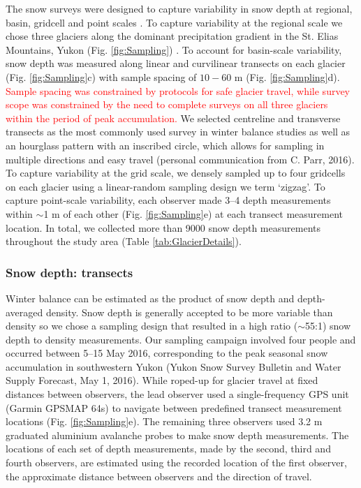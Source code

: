 \documentclass[twocolumn, letterpaper]{igs}
\begin{document}
The snow surveys were designed to capture variability in snow depth at regional, basin, gridcell and point scales \citep{Clark2011}. To capture variability at the regional scale we chose three glaciers along the dominant precipitation gradient in the St. Elias Mountains, Yukon (Fig. \ref{fig:Sampling}) \citep{Taylor1969}. To account for basin-scale variability, snow depth was measured along linear and curvilinear transects on each glacier (Fig. \ref{fig:Sampling}c) with sample spacing of $10-60$ m (Fig. \ref{fig:Sampling}d). \textcolor{red}{Sample spacing was constrained by protocols for safe glacier travel, while survey scope was constrained by the need to complete surveys on all three glaciers within the period of peak accumulation.} We selected centreline and transverse transects as the most commonly used survey in winter balance studies \citep[e.g.][]{Kaser2003, Machguth2006} as well as an hourglass pattern with an inscribed circle, which allows for sampling in multiple directions and easy travel (personal communication from C. Parr, 2016). To capture variability at the grid scale, we densely sampled up to four gridcells on each glacier using a linear-random sampling design we term `zigzag'. To capture point-scale variability, each observer made 3--4 depth measurements within $\sim$1 m of each other (Fig. \ref{fig:Sampling}e) at each transect measurement location. In total, we collected more than 9000 snow depth measurements throughout the study area (Table \ref {tab:GlacierDetails}). 

\subsubsection{Snow depth: transects}

Winter balance can be estimated as the product of snow depth and depth-averaged density. Snow depth is generally accepted to be more variable than density \citep{Elder1991, Clark2011, Lopez2013} so we chose a sampling design that resulted in a high ratio ($\sim$55:1) snow depth to density measurements. Our sampling campaign involved four people and occurred between 5--15 May 2016, corresponding to the peak seasonal snow accumulation in southwestern Yukon (Yukon Snow Survey Bulletin and Water Supply Forecast, May 1, 2016). While roped-up for glacier travel at fixed distances between observers, the lead observer used a single-frequency GPS unit (Garmin GPSMAP 64s) to navigate between predefined transect measurement locations (Fig. \ref{fig:Sampling}e). The remaining three observers used 3.2 m graduated aluminium avalanche probes to make snow depth measurements. The locations of each set of depth measurements, made by the second, third and fourth observers, are estimated using the recorded location of the first observer, the approximate distance between observers and the direction of travel. 
\end{document}
